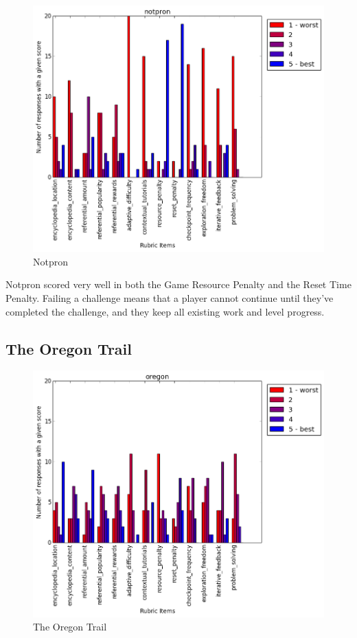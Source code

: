 				\begin{figure}[] 
				\centering 
				\includegraphics[width=\textwidth, height=.4\textheight, keepaspectratio=true]{notpron_scores.png} 
				\caption{Notpron}
				\end{figure}

				Notpron scored very well in both the Game Resource Penalty and the Reset Time Penalty. Failing a challenge means that a player cannot continue until they've completed the challenge, and they keep all existing work and level progress.

			\subsection{The Oregon Trail}

				\begin{figure}[] 
				\centering 
				\includegraphics[width=\textwidth, height=.4\textheight, keepaspectratio=true]{oregon_scores.png} 
				\caption{The Oregon Trail}
				\end{figure}

